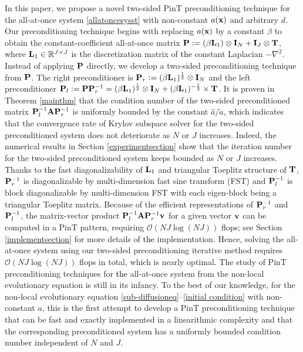 \documentclass[11pt]{article}%
\numberwithin{equation}{section}
\begin{document}
In this paper, we propose a novel two-sided PinT preconditioning technique for the all-at-once system  \eqref{allatoncesysst} with non-constant $a({\bf x})$ and arbitrary $d$. Our preconditioning technique begins with replacing $a({\bf x})$ by a constant $\beta$ to obtain the constant-coefficient all-at-once matrix ${\bf P}:=(\beta{\bf L}_1)\otimes{\bf I}_N+{\bf I}_J\otimes {\bf T}$, where ${\bf L}_1\in\mathbb{R}^{J\times J}$ is the discretization matrix of \textcolor{black}{the} constant Laplacian $-\nabla^2$.
Instead of applying ${\bf P}$ directly, we develop a two-sided preconditioning technique from ${\bf P}$. The right preconditioner is ${\bf P}_r:=(\beta{\bf L}_1)^{\frac{1}{2}}\otimes{\bf I}_N$ and the left preconditioner ${\bf P}_l:={\bf P}{\bf P}_r^{-1}=(\beta{\bf L}_1)^{\frac{1}{2}}\otimes{\bf I}_N+(\beta{\bf L}_1)^{-\frac{1}{2}}\times {\bf T}$. It is proven in Theorem \ref{mainthm} that the condition number of the two-sided preconditioned matrix ${\bf P}_l^{-1}{\bf A}{\bf P}_r^{-1}$ is uniformly bounded by the constant $\hat{a}/\check{a}$, which indicates that the convergence rate of  Krylov subspace solver for the two-sided preconditioned system  does not deteriorate as $N$ or $J$ increases. Indeed, the numerical results in Section \ref{experimentsection} show that the iteration number for the two-sided preconditioned system keeps bounded as $N$ or $J$ increases. 
Thanks to \textcolor{black}{the} fast diagonalizability of ${\bf L}_1$ and triangular Toeplitz structure of ${\bf T}$, ${\bf P}_r^{-1}$ is diagonalizable by multi-dimension fast sine transform (FST) and ${\bf P}_l^{-1}$ is block diagonalizable by multi-dimension FST with each eigen-block being a triangular Toeplitz matrix. Because of the efficient representations of ${\bf P}_r^{-1}$ and ${\bf P}_l^{-1}$, the matrix-vector product ${\bf P}_l^{-1}{\bf A}{\bf P}_r^{-1}{\bf v}$ for a  given vector ${\bf v}$ can be computed in a PinT pattern, requiring $\mathcal{O}(NJ\log (NJ))$ flops; see Section \ref{implementsection} for more details of \textcolor{black}{the} implementation. Hence, solving the all-at-once system using our two-sided preconditioning iterative method requires $\mathcal{O}(NJ\log(NJ))$ flops in total, which is nearly optimal. The study of PinT preconditioning techniques for \textcolor{black}{the} all-at-once system from the non-local evolutionary equation is still in its infancy.
To the best of our knowledge, for the non-local evolutionary equation \eqref{sub-diffusioneq}--\eqref{initial condition} with non-constant $a$, this is the first attempt to develop a PinT preconditioning technique that can be fast and exactly implemented in a linearithmic complexity and that the corresponding preconditioned system has a uniformly bounded condition number independent of $N$ and $J$. 
\end{document}
